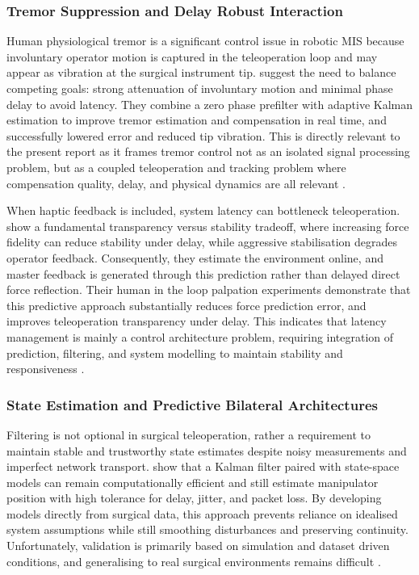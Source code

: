 \documentclass[12pt]{article}
\begin{document}
\subsubsection{Tremor Suppression and Delay Robust Interaction}

Human physiological tremor is a significant control issue in robotic MIS
because involuntary operator motion is captured in the teleoperation loop
and may appear as vibration at the surgical instrument tip. \textcite{sang2016zero}
suggest the need to balance competing goals: strong attenuation of involuntary motion and minimal phase delay to avoid latency.
They combine a zero phase
prefilter with adaptive Kalman estimation to improve tremor estimation and
compensation in real time, and successfully lowered
error and reduced tip vibration. This
is directly relevant to the present report as it frames tremor control not
as an isolated signal processing problem, but as a coupled teleoperation and
tracking problem where compensation quality, delay, and physical dynamics
are all relevant \parencite{sang2016zero}.

When haptic feedback is included, system latency can bottleneck teleoperation.
 \textcite{batty2022transparent} show a fundamental
transparency versus stability tradeoff, where increasing force fidelity can reduce
stability under delay, while aggressive stabilisation degrades operator
feedback. Consequently, they estimate the environment online, and master feedback
is generated through this prediction rather than delayed direct
force reflection. Their human in the loop palpation experiments demonstrate that
this predictive approach substantially reduces force prediction error, and
improves teleoperation transparency under delay. This indicates that latency management is mainly a
control architecture problem, requiring integration of prediction, filtering,
and system modelling to maintain stability and responsiveness
\parencite{batty2022transparent}.

\subsubsection{State Estimation and Predictive Bilateral Architectures}

Filtering is not optional in surgical teleoperation, rather a
 requirement to maintain stable and trustworthy state estimates
despite noisy measurements and imperfect network transport. \textcite{lashari2024enhancing}
show that a Kalman filter paired with state-space
models can remain computationally efficient and still estimate manipulator position with high tolerance for
delay, jitter, and packet loss. By
developing models directly from surgical data, this approach prevents reliance on
idealised system assumptions while still smoothing disturbances and preserving continuity. 
Unfortunately, validation is primarily based on
simulation and dataset driven conditions, and generalising to real surgical
environments remains difficult \parencite{lashari2024enhancing}.
\end{document}
